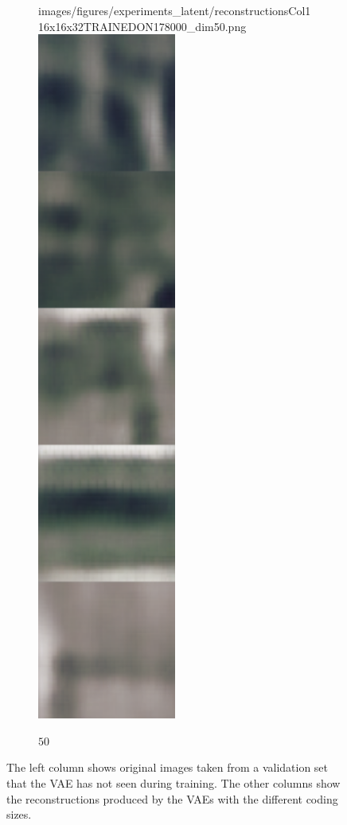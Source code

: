 \begin{figure}[H]
\begin{subfigure}[t]{.19\textwidth}
        {images/figures/experiments_latent/reconstructionsCol116x16x32TRAINEDON178000_dim50.png}\hfill
        \includegraphics[width=0.5\textwidth]
        {images/figures/experiments_latent/reconstructionsCol216x16x32TRAINEDON178000_dim50.png}
        \caption{$50$}
    \end{subfigure}
    \caption{The left column shows original images taken from a validation set that the VAE has not seen during
    training. The other columns show the reconstructions produced by the VAEs with the different coding sizes.}
    \label{figure_reconstructions_convolutional}
\end{figure} 

